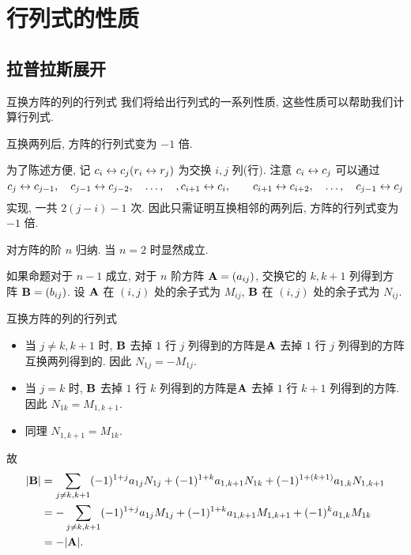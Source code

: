 \section{行列式的性质}

\subsection{拉普拉斯展开}

\begin{frame}{互换方阵的列的行列式}
	\onslide<+->
	我们将给出行列式的一系列性质, 这些性质可以帮助我们计算行列式.

	\onslide<+->
	\begin{alertblock@}
		互换两列后, 方阵的行列式变为 $-1$ 倍.
	\end{alertblock@}
	\onslide<+->
	为了陈述方便, 记 \alert{$c_i\leftrightarrow c_j (r_i\leftrightarrow r_j)$} 为交换 $i,j$ 列(行).
	\onslide<+->
	注意 $c_i\leftrightarrow c_j$ 可以通过
	\[c_j\leftrightarrow c_{j-1},\quad c_{j-1}\leftrightarrow c_{j-2},\quad \dots,\quad, c_{i+1}\leftrightarrow c_i,\qquad
	c_{i+1}\leftrightarrow c_{i+2},\quad \dots,\quad c_{j-1}\leftrightarrow c_j\]
	实现, 一共 $2(j-i)-1$ 次.
	\onslide<+->
	因此只需证明互换相邻的两列后, 方阵的行列式变为 $-1$ 倍.

	\onslide<+->
	对方阵的阶 $n$ 归纳.
	\onslide<+->
	当 $n=2$ 时显然成立.

	\onslide<+->
	如果命题对于 $n-1$ 成立, 对于 $n$ 阶方阵 ${\mathbf{A}}=(a_{ij})$, 交换它的 $k,k+1$ 列得到方阵 ${\mathbf{B}}=(b_{ij})$.
	\onslide<+->
	设 ${\mathbf{A}}$ 在 $(i,j)$ 处的余子式为 $M_{ij}$, ${\mathbf{B}}$ 在 $(i,j)$ 处的余子式为 $N_{ij}$.
\end{frame}


\begin{frame}{互换方阵的列的行列式}
	\onslide<+->
	\begin{itemize}
		\item 当 $j\neq k,k+1$ 时, ${\mathbf{B}}$ 去掉 $1$ 行 $j$ 列得到的方阵是${\mathbf{A}}$ 去掉 $1$ 行 $j$ 列得到的方阵互换两列得到的.
		\onslide<+->
		因此 $N_{1j}=-M_{1j}$.
		\item 当 $j=k$ 时, ${\mathbf{B}}$ 去掉 $1$ 行 $k$ 列得到的方阵是${\mathbf{A}}$ 去掉 $1$ 行 $k+1$ 列得到的方阵.
		\onslide<+->
		因此 $N_{1k}=M_{1,k+1}$.
		\item 同理 $N_{1,k+1}=M_{1k}$.
	\end{itemize}
	\onslide<+->
	故
	\begin{align*}
		|{\mathbf{B}}|&=\sum_{j\neq k,k+1} (-1)^{1+j}a_{1j} N_{1j}
		+(-1)^{1+k}a_{1,k+1}N_{1k}+(-1)^{1+(k+1)}a_{1,k}N_{1,k+1}\\
		&=-\sum_{j\neq k,k+1} (-1)^{1+j}a_{1j} M_{1j}
		+(-1)^{1+k}a_{1,k+1}M_{1,k+1}+(-1)^{k}a_{1,k}M_{1k}\\
		&=-|{\mathbf{A}}|.
	\end{align*}
\end{frame}


